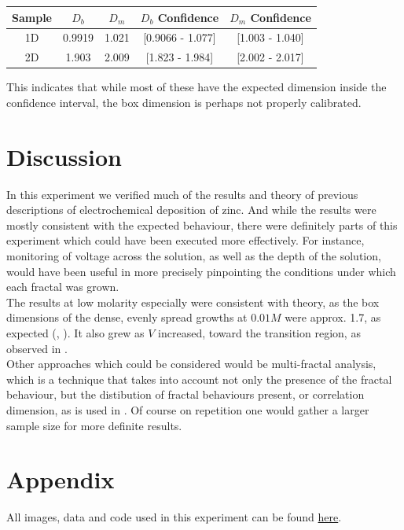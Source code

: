 \documentclass{article}
\theoremstyle{definition}
\theoremstyle{remark}
\begin{document}
\begin{center}
        \begin{tabular}{|c|c|c|c|c|}
                \hline
                Sample & $D_b$ & $D_m$ & $D_b$ Confidence & $D_m$ Confidence \\ \hline
                1D & 0.9919 & 1.021 & [0.9066 - 1.077] & [1.003 - 1.040]\\ \hline
                2D & 1.903 & 2.009 & [1.823 - 1.984] & [2.002 - 2.017] \\ \hline
        \end{tabular}
\end{center}
This indicates that while most of these have the expected dimension inside the confidence interval, the box dimension is perhaps not properly calibrated.
\section{Discussion}
In this experiment we verified much of the results and theory of previous descriptions of electrochemical deposition of zinc. And while the results were mostly consistent with the expected behaviour, there were definitely parts of this experiment which could have been executed more effectively. For instance, monitoring of voltage across the solution, as well as the depth of the solution, would have been useful in more precisely pinpointing the conditions under which each fractal was grown.\\
\indent The results at low molarity especially were consistent with theory, as the box dimensions of the dense, evenly spread growths at $0.01M$ were approx. 1.7, as expected (\cite{1981PhRvL..47.1400W}, \cite{PhysRevLett.59.2315}). It also grew as $V$ increased, toward the transition region, as observed in \cite{PhysRevLett.59.2315}.\\
\indent Other approaches which could be considered would be multi-fractal analysis, which is a technique that takes into account not only the presence of the fractal behaviour, but the distibution of fractal behaviours present, or correlation dimension, as is used in \cite{1981PhRvL..47.1400W}. Of course on repetition one would gather a larger sample size for more definite results. \\





\section*{Appendix}\label{sec:appendix}
All images, data and code used in this experiment can be found \href{https://github.com/DavidLawton04/MuchStuff/tree/0e61b8d6692b4b1c47f4bab8d9bb8fb7e5c122d6/Junior%20Sophister/JS%20Labs/Fractals}{here}.
\end{document}
